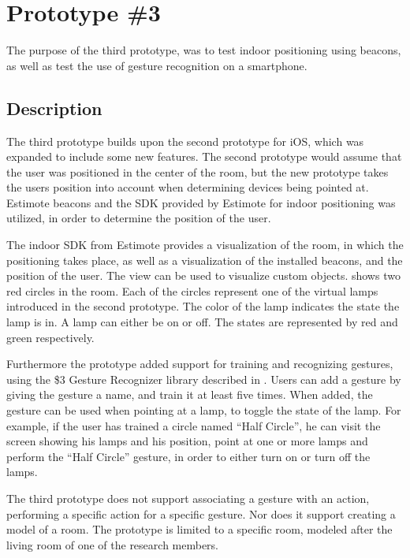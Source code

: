 \section{Prototype \#3}
\label{sec:implementation:prototypes:prototype3}

The purpose of the third prototype, 
was to test indoor positioning using beacons, 
as well as test the use of gesture recognition on a smartphone.

\subsection{Description}
The third prototype builds upon the second prototype for iOS, 
which was expanded to include some new features. 
The second prototype would assume that the user was positioned in the center of the room, 
but the new prototype takes the users position into account when determining devices being pointed at. 
Estimote beacons and the SDK provided by Estimote for indoor positioning was utilized, 
in order to determine the position of the user.

The indoor SDK from Estimote provides a visualization of the room, 
in which the positioning takes place, 
as well as a visualization of the installed beacons, 
and the position of the user. 
The view can be used to visualize custom objects. 
 shows two red circles in the room. 
Each of the circles represent one of the virtual lamps introduced in the second prototype. 
The color of the lamp indicates the state the lamp is in. 
A lamp can either be on or off. 
The states are represented by red and green respectively.

Furthermore the prototype added support for training and recognizing gestures, 
using the \$3 Gesture Recognizer library described in .
Users can add a gesture by giving the gesture a name, 
and train it at least five times. 
When added, the gesture can be used when pointing at a lamp, 
to toggle the state of the lamp. 
For example, if the user has trained a circle named ``Half Circle'', 
he can visit the screen showing his lamps and his position, 
point at one or more lamps and perform the ``Half Circle'' gesture, 
in order to either turn on or turn off the lamps.

The third prototype does not support associating a gesture with an action, 
\ie performing a specific action for a specific gesture. 
Nor does it support creating a model of a room. 
The prototype is limited to a specific room, 
modeled after the living room of one of the research members.

